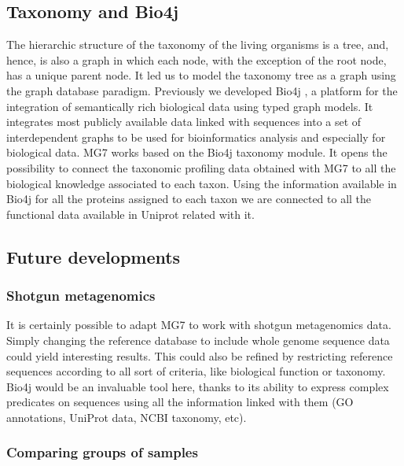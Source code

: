 \documentclass[fleqn,10pt,lineno]{wlpeerj}
\begin{document}
\subsection{Taxonomy and Bio4j}\label{taxonomy-and-bio4j}

The hierarchic structure of the taxonomy of the living organisms is a
tree, and, hence, is also a graph in which each node, with the exception
of the root node, has a unique parent node. It led us to model the
taxonomy tree as a graph using the graph database paradigm. Previously
we developed Bio4j \citep{pareja2015bio4j}, a platform for the
integration of semantically rich biological data using typed graph
models. It integrates most publicly available data linked with sequences
into a set of interdependent graphs to be used for bioinformatics
analysis and especially for biological data. MG7 works based on the
Bio4j taxonomy module. It opens the possibility to connect the taxonomic
profiling data obtained with MG7 to all the biological knowledge
associated to each taxon. Using the information available in Bio4j for
all the proteins assigned to each taxon we are connected to all the
functional data available in Uniprot related with it.

\subsection{Future developments}\label{future-developments}

\subsubsection{Shotgun metagenomics}\label{shotgun-metagenomics}

It is certainly possible to adapt MG7 to work with shotgun metagenomics
data. Simply changing the reference database to include whole genome
sequence data could yield interesting results. This could also be
refined by restricting reference sequences according to all sort of
criteria, like biological function or taxonomy. Bio4j would be an
invaluable tool here, thanks to its ability to express complex
predicates on sequences using all the information linked with them (GO
annotations, UniProt data, NCBI taxonomy, etc).

\subsubsection{Comparing groups of
samples}\label{comparing-groups-of-samples}
\end{document}
